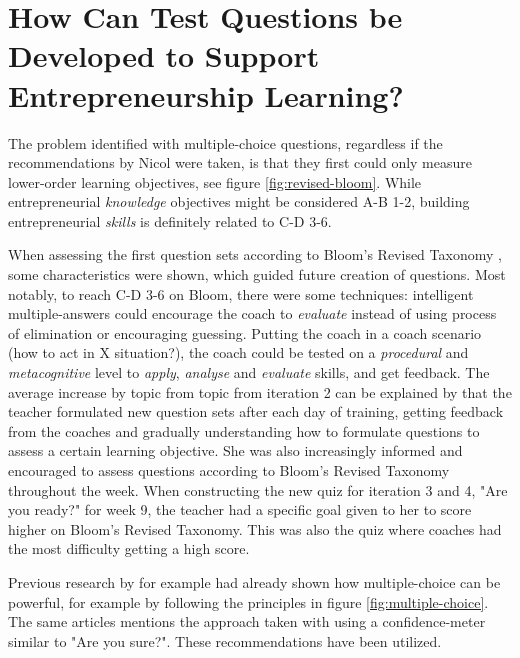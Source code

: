 
\section{How Can Test Questions be Developed to Support Entrepreneurship Learning?} %

  The problem identified with multiple-choice questions, regardless if the recommendations by Nicol \cite{nicol} were taken, is that they first could only measure lower-order learning objectives, see figure \ref{fig:revised-bloom}. While entrepreneurial \textit{knowledge} objectives might be considered A-B 1-2, building entrepreneurial \textit{skills} is definitely related to C-D 3-6.

  When assessing the first question sets according to Bloom's Revised Taxonomy \citep{krathwohl}, some characteristics were shown, which guided future creation of questions. Most notably, to reach C-D 3-6 on Bloom, there were some techniques: intelligent multiple-answers could encourage the coach to \textit{evaluate} instead of using process of elimination or encouraging guessing. Putting the coach in a coach scenario (how to act in X situation?), the coach could be tested on a \textit{procedural} and \textit{metacognitive} level to \textit{apply}, \textit{analyse} and \textit{evaluate} skills, and get feedback. The average increase by topic from topic from iteration 2 can be explained by that the teacher formulated new question sets after each day of training, getting feedback from the coaches and gradually understanding how to formulate questions to assess a certain learning objective. She was also increasingly informed and encouraged to assess questions according to Bloom's Revised Taxonomy throughout the week. When constructing the new quiz for iteration 3 and 4, "Are you ready?" for week 9, the teacher had a specific goal given to her to score higher on Bloom's Revised Taxonomy. This was also the quiz where coaches had the most difficulty getting a high score.

  Previous research by for example \cite{nicol} had already shown how multiple-choice can be powerful, for example by following the principles in figure \ref{fig:multiple-choice}. The same articles mentions the approach taken with using a confidence-meter similar to "Are you sure?". These recommendations have been utilized.

